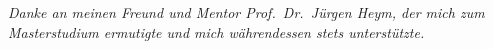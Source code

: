 \clearpage
\thispagestyle{empty}

\begin{center}
\noindent
\emph{Danke an meinen Freund und Mentor Prof.~Dr.~Jürgen Heym, der mich zum Masterstudium ermutigte und mich währendessen stets unterstützte.}
\end{center}


\restoregeometry
